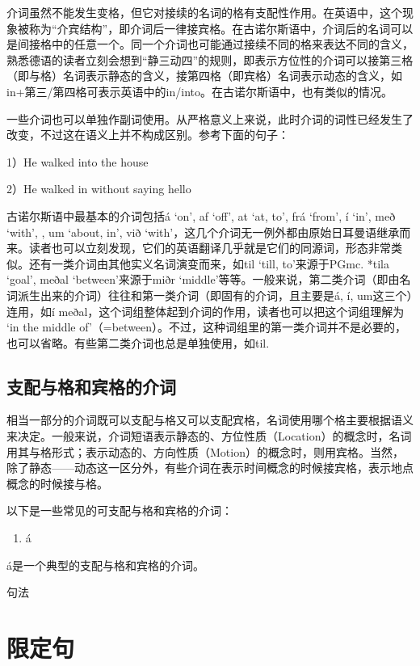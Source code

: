 介词虽然不能发生变格，但它对接续的名词的格有支配性作用。在英语中，这个现象被称为``介宾结构''，即介词后一律接宾格。在古诺尔斯语中，介词后的名词可以是间接格中的任意一个。同一个介词也可能通过接续不同的格来表达不同的含义，熟悉德语的读者立刻会想到``静三动四''的规则，即表示方位性的介词可以接第三格（即与格）名词表示静态的含义，接第四格（即宾格）名词表示动态的含义，如in+第三/第四格可表示英语中的in/into。在古诺尔斯语中，也有类似的情况。

一些介词也可以单独作副词使用。从严格意义上来说，此时介词的词性已经发生了改变，不过这在语义上并不构成区别。参考下面的句子：

1）He walked into the house

2）He walked in without saying hello

古诺尔斯语中最基本的介词包括á `on', af `off', at `at, to', frá `from', í
`in', með `with', , um `about, in', við
`with'，这几个介词无一例外都由原始日耳曼语继承而来。读者也可以立刻发现，它们的英语翻译几乎就是它们的同源词，形态非常类似。还有一类介词由其他实义名词演变而来，如til
`till, to'来源于PGmc. *tila `goal', meðal `between'来源于miðr
`middle'等等。一般来说，第二类介词（即由名词派生出来的介词）往往和第一类介词（即固有的介词，且主要是á,
í, um这三个）连用，如í
meðal，这个词组整体起到介词的作用，读者也可以把这个词组理解为 `in the
middle
of'（=between）。不过，这种词组里的第一类介词并不是必要的，也可以省略。有些第二类介词也总是单独使用，如til.

\subsection{支配与格和宾格的介词}\label{ux652fux914dux4e0eux683cux548cux5bbeux683cux7684ux4ecbux8bcd}

相当一部分的介词既可以支配与格又可以支配宾格，名词使用哪个格主要根据语义来决定。一般来说，介词短语表示静态的、方位性质（Location）的概念时，名词用其与格形式；表示动态的、方向性质（Motion）的概念时，则用宾格。当然，除了静态------动态这一区分外，有些介词在表示时间概念的时候接宾格，表示地点概念的时候接与格。

以下是一些常见的可支配与格和宾格的介词：

\begin{enumerate}
\def\labelenumi{\arabic{enumi}.}
\item
  á
\end{enumerate}

á是一个典型的支配与格和宾格的介词。

句法

\section{限定句}\label{ux9650ux5b9aux53e5}

